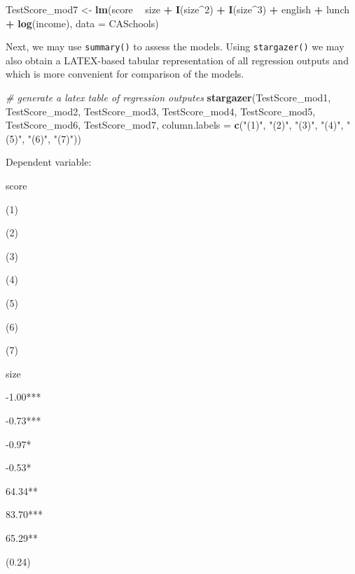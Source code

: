 \documentclass[]{book}
\newenvironment{Shaded}{\begin{snugshade}}{\end{snugshade}}
\newcommand{\KeywordTok}[1]{\textcolor[rgb]{0.13,0.29,0.53}{\textbf{#1}}}
\newcommand{\DataTypeTok}[1]{\textcolor[rgb]{0.13,0.29,0.53}{#1}}
\newcommand{\DecValTok}[1]{\textcolor[rgb]{0.00,0.00,0.81}{#1}}
\newcommand{\StringTok}[1]{\textcolor[rgb]{0.31,0.60,0.02}{#1}}
\newcommand{\CommentTok}[1]{\textcolor[rgb]{0.56,0.35,0.01}{\textit{#1}}}
\newcommand{\OperatorTok}[1]{\textcolor[rgb]{0.81,0.36,0.00}{\textbf{#1}}}
\newcommand{\NormalTok}[1]{#1}
\theoremstyle{definition}
\theoremstyle{definition}
\theoremstyle{definition}
\theoremstyle{remark}
\begin{document}
\begin{Shaded}
\begin{Highlighting}[]
\NormalTok{TestScore_mod7 <-}\StringTok{ }\KeywordTok{lm}\NormalTok{(score }\OperatorTok{~}\StringTok{ }\NormalTok{size }\OperatorTok{+}\StringTok{ }\KeywordTok{I}\NormalTok{(size}\OperatorTok{^}\DecValTok{2}\NormalTok{) }\OperatorTok{+}\StringTok{ }\KeywordTok{I}\NormalTok{(size}\OperatorTok{^}\DecValTok{3}\NormalTok{) }\OperatorTok{+}\StringTok{ }\NormalTok{english }\OperatorTok{+}\StringTok{ }\NormalTok{lunch }\OperatorTok{+}\StringTok{ }
\StringTok{    }\KeywordTok{log}\NormalTok{(income), }\DataTypeTok{data =}\NormalTok{ CASchools)}
\end{Highlighting}
\end{Shaded}

Next, we may use \texttt{summary()} to assess the models. Using
\texttt{stargazer()} we may also obtain a LATEX-based tabular
representation of all regression outputs and which is more convenient
for comparison of the models.

\begin{Shaded}
\begin{Highlighting}[]
\CommentTok{# generate a latex table of regression outputes}
\KeywordTok{stargazer}\NormalTok{(TestScore_mod1, TestScore_mod2, TestScore_mod3, TestScore_mod4, TestScore_mod5, }
\NormalTok{    TestScore_mod6, TestScore_mod7, }\DataTypeTok{column.labels =} \KeywordTok{c}\NormalTok{(}\StringTok{"(1)"}\NormalTok{, }\StringTok{"(2)"}\NormalTok{, }\StringTok{"(3)"}\NormalTok{, }\StringTok{"(4)"}\NormalTok{, }
        \StringTok{"(5)"}\NormalTok{, }\StringTok{"(6)"}\NormalTok{, }\StringTok{"(7)"}\NormalTok{))}
\end{Highlighting}
\end{Shaded}

Dependent variable:

score

(1)

(2)

(3)

(4)

(5)

(6)

(7)

size

-1.00***

-0.73***

-0.97*

-0.53*

64.34**

83.70***

65.29**

(0.24)
\end{document}

